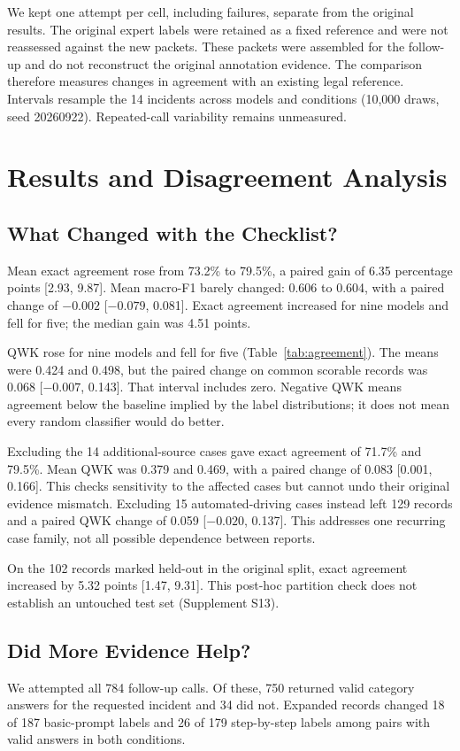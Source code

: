 \documentclass[sigconf,natbib=false,language=english]{acmart}
\begin{document}
We kept one attempt per cell, including failures, separate from the original results. The original expert labels were retained as a fixed reference and were not reassessed against the new packets. These packets were assembled for the follow-up and do not reconstruct the original annotation evidence. The comparison therefore measures changes in agreement with an existing legal reference. Intervals resample the 14 incidents across models and conditions (10,000 draws, seed 20260922). Repeated-call variability remains unmeasured.

\section{Results and Disagreement Analysis}
\subsection{What Changed with the Checklist?}
Mean exact agreement rose from 73.2\% to 79.5\%, a paired gain of 6.35 percentage points [2.93, 9.87]. Mean macro-F1 barely changed: 0.606 to 0.604, with a paired change of $-0.002$ [$-0.079$, 0.081]. Exact agreement increased for nine models and fell for five; the median gain was 4.51 points.

QWK rose for nine models and fell for five (Table~\ref{tab:agreement}). The means were 0.424 and 0.498, but the paired change on common scorable records was 0.068 [$-0.007$, 0.143]. That interval includes zero. Negative QWK means agreement below the baseline implied by the label distributions; it does not mean every random classifier would do better.



Excluding the 14 additional-source cases gave exact agreement of 71.7\% and 79.5\%. Mean QWK was 0.379 and 0.469, with a paired change of 0.083 [0.001, 0.166]. This checks sensitivity to the affected cases but cannot undo their original evidence mismatch. Excluding 15 automated-driving cases instead left 129 records and a paired QWK change of 0.059 [$-0.020$, 0.137]. This addresses one recurring case family, not all possible dependence between reports.

On the 102 records marked held-out in the original split, exact agreement increased by 5.32 points [1.47, 9.31]. This post-hoc partition check does not establish an untouched test set (Supplement S13).

\subsection{Did More Evidence Help?}
We attempted all 784 follow-up calls. Of these, 750 returned valid category answers for the requested incident and 34 did not. Expanded records changed 18 of 187 basic-prompt labels and 26 of 179 step-by-step labels among pairs with valid answers in both conditions.
\end{document}
